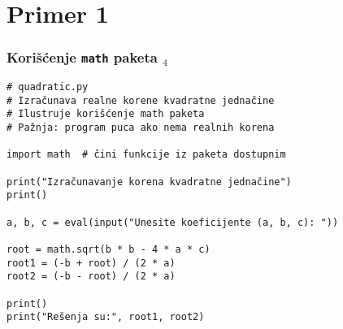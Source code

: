 \documentclass[utf8,compress]{beamer}
\begin{document}


\section{Primer 1}

\begin{frame}[fragile,shrink=5]
  \frametitle{Korišćenje \texttt{math} paketa $_4$}
\begin{verbatim}
# quadratic.py
# Izračunava realne korene kvadratne jednačine
# Ilustruje korišćenje math paketa
# Pažnja: program puca ako nema realnih korena

import math  # čini funkcije iz paketa dostupnim

print("Izračunavanje korena kvadratne jednačine")
print()

a, b, c = eval(input("Unesite koeficijente (a, b, c): "))

root = math.sqrt(b * b - 4 * a * c)
root1 = (-b + root) / (2 * a)
root2 = (-b - root) / (2 * a)

print()
print("Rešenja su:", root1, root2)
\end{verbatim}
\end{frame}
\end{document}
